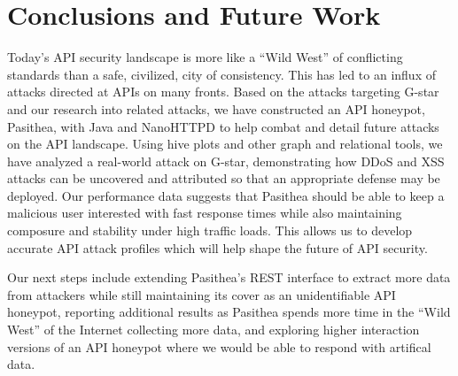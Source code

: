 
\section{Conclusions and Future Work} \label{conclusions}

Today's API security landscape is more like a ``Wild West'' of conflicting standards than a safe, civilized, city of consistency.
This has led to an influx of attacks directed at APIs on many  fronts. 
Based on the attacks targeting G-star and our research into related attacks, we have constructed an API honeypot, Pasithea, with Java and NanoHTTPD to help combat and detail future attacks on the API landscape. 
Using hive plots and other graph and relational tools, we have analyzed a real-world attack on G-star, demonstrating how DDoS and XSS attacks can be uncovered and attributed so that an appropriate defense may be deployed.  
Our performance data suggests that Pasithea should be able to keep a malicious user interested with fast response times while also maintaining composure and stability under high traffic loads. 
This allows us to develop accurate API attack profiles which will help shape the future of API security.

Our next steps include extending Pasithea's REST interface to extract more data from attackers while still maintaining its cover as an unidentifiable API honeypot, reporting additional results as Pasithea spends more time in the ``Wild West'' of the Internet collecting more data, and exploring higher interaction versions of an API honeypot where we would be able to respond with artifical data.
